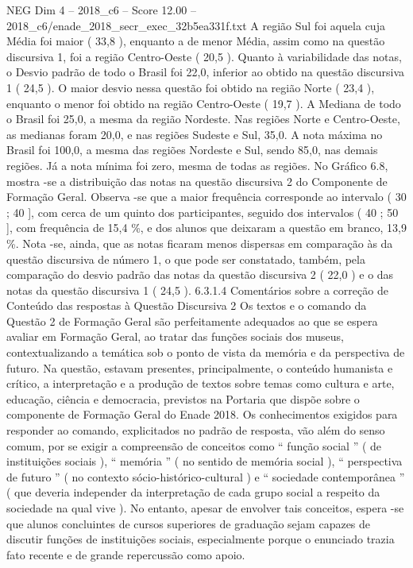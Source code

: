 \begin{textsample}{NEG Dim 4 – 2018\_c6 – Score 12.00 – 2018\_c6/enade\_2018\_secr\_exec\_32b5ea331f.txt}
A região Sul foi aquela cuja Média foi maior ( 33,8 ), enquanto a de menor Média, assim como na questão discursiva 1, foi a região Centro-Oeste ( 20,5 ).
Quanto à variabilidade das notas, o Desvio padrão de todo o Brasil foi 22,0, inferior ao obtido na questão discursiva 1 ( 24,5 ).
O maior desvio nessa questão foi obtido na região Norte ( 23,4 ), enquanto o menor foi obtido na região Centro-Oeste ( 19,7 ).
A Mediana de todo o Brasil foi 25,0, a mesma da região Nordeste.
Nas regiões Norte e Centro-Oeste, as medianas foram 20,0, e nas regiões Sudeste e Sul, 35,0.
A nota máxima no Brasil foi 100,0, a mesma das regiões Nordeste e Sul, sendo 85,0, nas demais regiões.
Já a nota mínima foi zero, mesma de todas as regiões.
No Gráfico 6.8, mostra -se a distribuição das notas na questão discursiva 2 do Componente de Formação Geral.
Observa -se que a maior frequência corresponde ao intervalo ( 30 ; 40 ], com cerca de um quinto dos participantes, seguido dos intervalos ( 40 ; 50 ], com frequência de 15,4 \%, e dos alunos que deixaram a questão em branco, 13,9 \%.
Nota -se, ainda, que as notas ficaram menos dispersas em comparação às da questão discursiva de número 1, o que pode ser constatado, também, pela comparação do desvio padrão das notas da questão discursiva 2 ( 22,0 ) e o das notas da questão discursiva 1 ( 24,5 ). 6.3.1.4 Comentários sobre a correção de Conteúdo das respostas à Questão Discursiva 2 Os textos e o comando da Questão 2 de Formação Geral são perfeitamente adequados ao que se espera avaliar em Formação Geral, ao tratar das funções sociais dos museus, contextualizando a temática sob o ponto de vista da memória e da perspectiva de futuro.
Na questão, estavam presentes, principalmente, o conteúdo humanista e crítico, a interpretação e a produção de textos sobre temas como cultura e arte, educação, ciência e democracia, previstos na Portaria que dispõe sobre o componente de Formação Geral do Enade 2018.
Os conhecimentos exigidos para responder ao comando, explicitados no padrão de resposta, vão além do senso comum, por se exigir a compreensão de conceitos como “ função social ” ( de instituições sociais ), “ memória ” ( no sentido de memória social ), “ perspectiva de futuro ” ( no contexto sócio-histórico-cultural ) e “ sociedade contemporânea ” ( que deveria independer da interpretação de cada grupo social a respeito da sociedade na qual vive ).
No entanto, apesar de envolver tais conceitos, espera -se que alunos concluintes de cursos superiores de graduação sejam capazes de discutir funções de instituições sociais, especialmente porque o enunciado trazia fato recente e de grande repercussão como apoio.

\end{textsample}
